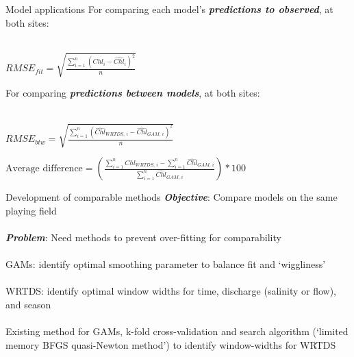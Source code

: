 \documentclass[serif]{beamer}\usepackage[]{graphicx}\usepackage[]{color}
\newcommand{\Bigtxt}[1]{\textbf{\textit{#1}}}
\begin{document}
\begin{frame}{Model applications}
For comparing each model's \Bigtxt{predictions to observed}, at both sites:\\~\\
\begin{center}
$RMSE_{fit} = \sqrt {\frac{{\sum\limits_{{i = 1}}^n {{{\left( {{Chl_i} - {\widehat{Chl}_i}} \right)}^2}} }}{n}}$
\end{center}
For comparing \Bigtxt{predictions between models}, at both sites: \\~\\
\begin{center} 
$RMSE_{btw} = \sqrt {\frac{{\sum\limits_{{i = 1}}^n {{{\left( {{\widehat{Chl}_{WRTDS,\,i}} - {{\widehat{Chl}}_{GAM,\,i}}} \right)}^2}} }}{n}}$
\end{center}
\begin{center}
$\textrm{Average difference} = \left(\frac{\sum\limits_{i = 1}^n \widehat{Chl}_{WRTDS,\,i} - \sum\limits_{i = 1}^n \widehat{Chl}_{GAM,\,i}}{\sum\limits_{i = 1}^n \widehat{Chl}_{GAM,\,i}}\right) * 100$
\end{center}
\end{frame}

\begin{frame}{Development of comparable methods}
\Bigtxt{Objective}: Compare models on the same playing field \\~\\
\Bigtxt{Problem}: Need methods to prevent over-fitting for comparability \\~\\
GAMs: identify optimal smoothing parameter to balance fit and `wiggliness' \\~\\
WRTDS: identify optimal window widths for time, discharge (salinity or flow), and season \\~\\
Existing method for GAMs, k-fold cross-validation and search algorithm (`limited memory BFGS quasi-Newton method') to identify window-widths for WRTDS
\end{frame}
\end{document}

